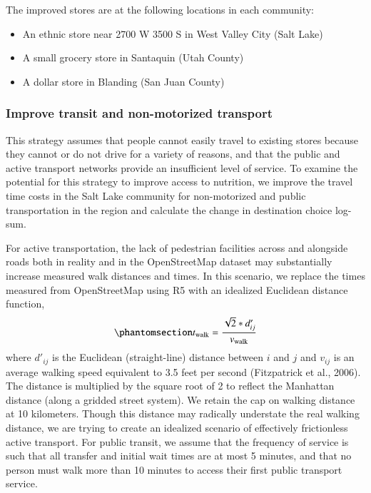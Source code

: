 \documentclass[
  letterpaper,
  number,
  review,
  3p]{elsarticle}
\providecommand{\tightlist}{%
  \setlength{\itemsep}{0pt}\setlength{\parskip}{0pt}}\usepackage{longtable,booktabs,array}
\begin{document}
The improved stores are at the following locations in each community:

\begin{itemize}
\tightlist
\item
  An ethnic store near 2700 W 3500 S in West Valley City (Salt Lake)
\item
  A small grocery store in Santaquin (Utah County)
\item
  A dollar store in Blanding (San Juan County)
\end{itemize}

\subsubsection{Improve transit and non-motorized
transport}\label{improve-transit-and-non-motorized-transport}

This strategy assumes that people cannot easily travel to existing
stores because they cannot or do not drive for a variety of reasons, and
that the public and active transport networks provide an insufficient
level of service. To examine the potential for this strategy to improve
access to nutrition, we improve the travel time costs in the Salt Lake
community for non-motorized and public transportation in the region and
calculate the change in destination choice log-sum.

For active transportation, the lack of pedestrian facilities across and
alongside roads both in reality and in the OpenStreetMap dataset may
substantially increase measured walk distances and times. In this
scenario, we replace the times measured from OpenStreetMap using R5 with
an idealized Euclidean distance function,
\begin{equation}\phantomsection\label{eq-newwalk}{
t_{\mathrm{walk}} = \frac{\sqrt{2} * d'_{ij}}{v_{\mathrm{walk}}}
}\end{equation} where \(d'_{ij}\) is the Euclidean (straight-line)
distance between \(i\) and \(j\) and \(v_{ij}\) is an average walking
speed equivalent to 3.5 feet per second (Fitzpatrick et al., 2006). The
distance is multiplied by the square root of 2 to reflect the Manhattan
distance (along a gridded street system). We retain the cap on walking
distance at 10 kilometers. Though this distance may radically understate
the real walking distance, we are trying to create an idealized scenario
of effectively frictionless active transport. For public transit, we
assume that the frequency of service is such that all transfer and
initial wait times are at most 5 minutes, and that no person must walk
more than 10 minutes to access their first public transport service.
\end{document}

